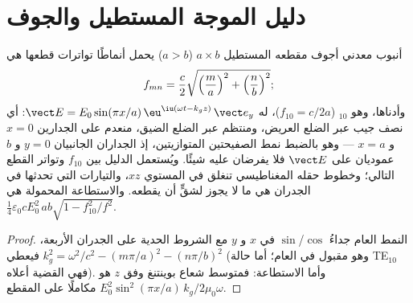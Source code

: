 \section{دليل الموجة المستطيل والجوف}

\begin{proposition}\label{prop:b2:guided-waves:rectangular}
أنبوب معدني أجوف مقطعه المستطيل $a \times b$ ($a > b$) يحمل
أنماطًا تواترات قطعها هي
\[
f_{mn} = \frac c2\sqrt{\Bigl(\frac ma\Bigr)^2 + \Bigl(\frac nb\Bigr)^2} ;
\]
وأدناها، وهو \emph{$_{10}$} ($f_{10} = c/2a$)، له $\vect E = E_0\sin
(\pi x/a)\,\eu^{\iu(\omega t - k_gz)}\,\vect e_y$: أي نصف جيب عبر الضلع
العريض، ومنتظم عبر الضلع الضيق، منعدم على الجدارين $x = 0$
و $x = a$ --- وهو بالضبط نمط الصفيحتين المتوازيتين، إذ الجداران
الجانبيان $y = 0$ و $b$ عموديان على $\vect E$ فلا يفرضان عليه شيئًا. ويُستعمل
الدليل بين $f_{10}$ وتواتر القطع التالي؛ وخطوط حقله المغناطيسي
تنغلق في المستوي $xz$، والتيارات التي تحدثها في الجدران
هي ما لا يجوز لشقٍّ أن يقطعه. والاستطاعة المحمولة هي $\tfrac14\varepsilon_0cE_0^2\,ab
\sqrt{1 - f_{10}^2/f^2}$.
\end{proposition}

\begin{proof}
النمط العام جداءُ $\cos$/$\sin$ في $x$ و $y$ مع
الشروط الحدية على الجدران الأربعة، فيعطي $k_g^2 = \omega^2/c^2 - (m\pi/a)^2
- (n\pi/b)^2$ (وهو مقبول في العام؛ أما حالة TE$_{10}$ فهي القضية
أعلاه). وأما الاستطاعة: فمتوسط شعاع بوينتنغ وفق $z$ هو $E_0^2\sin^2(\pi x/a)
\,k_g/2\mu_0\omega$ مكاملًا على المقطع.
\end{proof}

